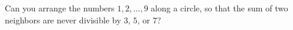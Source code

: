 Can you arrange the numbers $1, 2, \ldots, 9$ along a circle, so that the sum of two neighbors are never divisible by $3$, $5$, or $7$?

